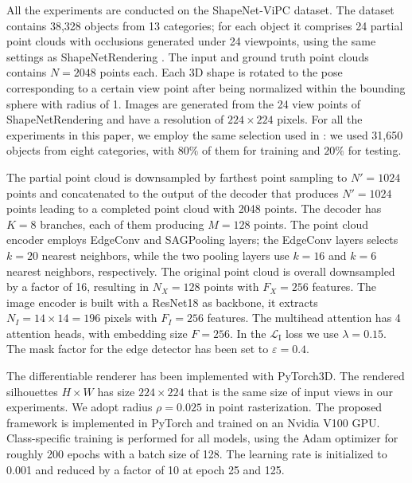 \documentclass{article}
\begin{document}
All the experiments are conducted on the ShapeNet-ViPC\cite{vipc} dataset.
The dataset contains 38,328 objects from 13 categories; for each object it comprises 24 partial point clouds with occlusions generated under 24 viewpoints, using the same settings as ShapeNetRendering \cite{chang2015shapenet}. The input and ground truth point clouds contains $N = 2048$ points each.
Each 3D shape is rotated to the pose corresponding to a certain view point after being normalized within the bounding sphere with radius of 1. Images are generated from the 24 view points of ShapeNetRendering and have a resolution of $224 \times 224$ pixels. For all the experiments in this paper, we employ the same selection used in \cite{vipc}: we used 31,650 objects from eight categories, with $80\%$ of them for training and $20\%$ for testing.

The partial point cloud is downsampled by farthest point sampling to $N' = 1024$ points and concatenated to the output of the decoder that produces $N' = 1024$ points leading to a completed point cloud with 2048 points. The decoder has $K=8$ branches, each of them producing $M=128$ points. 
The point cloud encoder employs EdgeConv and SAGPooling layers; the EdgeConv layers selects $k=20$ nearest neighbors, while the two pooling layers use $k = 16$ and $k = 6$ nearest neighbors, respectively. The original point cloud is overall downsampled by a factor of 16, resulting in $N_X=128$ points with $F_X = 256$ features.
The image encoder is built with a ResNet18 \cite{resnet} as backbone, it extracts $N_I=14\times14=196$ pixels with $F_I = 256$ features. The multihead attention has 4 attention heads, with embedding size $F=256$. In the $\mathcal{L}_\text{I}$ loss we use $\lambda=0.15$. The mask factor for the edge detector has been set to $\varepsilon=0.4$.

The differentiable renderer has been implemented with PyTorch3D\cite{Ravi2020Accelerating3D}. The rendered silhouettes $H \times W$ has size $224 \times 224$ that is the same size of input views in our experiments. We adopt radius $\rho = 0.025$ in point rasterization. The proposed framework is implemented in PyTorch and trained on an Nvidia V100 GPU. Class-specific training is performed for all models, using the Adam optimizer \cite{Kingma2015AdamAM} for roughly 200 epochs with a batch size of 128. The learning rate is initialized to 0.001 and reduced by a factor of 10 at epoch 25 and 125. 
\end{document}

